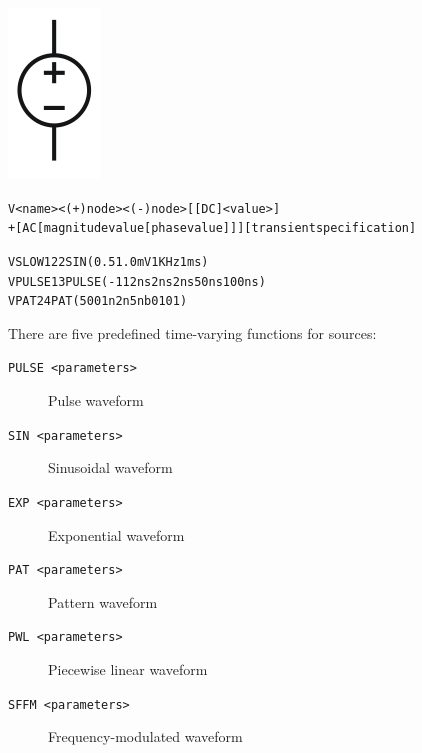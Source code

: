 


\begin{Device}\label{V_DEVICE}

\symbol
{\includegraphics{ivsSymbol}}

\device
\begin{alltt}
V<name> <(+) node> <(-) node> [ [DC] <value> ]
+ [AC [magnitude value [phase value] ] ] [transient specification]
\end{alltt}

\examples
\begin{alltt}
VSLOW 1 22 SIN(0.5 1.0mV 1KHz 1ms)
VPULSE 1 3 PULSE(-1 1 2ns 2ns 2ns 50ns 100ns)
VPAT 2 4 PAT(5 0 0 1n 2n 5n b0101)
\end{alltt}


\parameters

\begin{Parameters}


There are five predefined time-varying functions for sources:

\begin{description}
\item[\tt PULSE <parameters>] Pulse waveform
\item[\tt SIN <parameters>] Sinusoidal waveform
\item[\tt EXP <parameters>] Exponential waveform
\item[\tt PAT <parameters>] Pattern waveform
\item[\tt PWL <parameters>] Piecewise linear waveform
\item[\tt SFFM <parameters>] Frequency-modulated waveform
\end{description}


\end{Parameters}
\end{Device}
